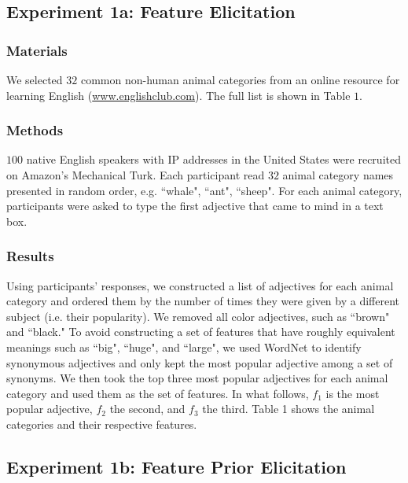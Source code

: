 \documentclass[10pt,letterpaper]{article}
\begin{document}
\subsection{Experiment 1a: Feature Elicitation}
\subsubsection{Materials}
We selected $32$ common non-human animal categories from an online resource for learning English (\url{www.englishclub.com}). The full list is shown in Table $1$.
\subsubsection{Methods}
$100$ native English speakers with IP addresses in the United States were recruited on Amazon's Mechanical Turk. Each participant read $32$ animal category names presented in random order, e.g. ``whale", ``ant", ``sheep". For each animal category, participants were asked to type the first adjective that came to mind in a text box. 
\subsubsection{Results}
Using participants' responses, we constructed a list of adjectives for each animal category and ordered them by the number of times they were given by a different subject (i.e. their popularity). We removed all color adjectives, such as ``brown" and ``black." To avoid constructing a set of features that have roughly equivalent meanings such as ``big", ``huge", and ``large", we used WordNet \cite{Miller95wordnet:a} to identify synonymous adjectives and only kept the most popular adjective among a set of synonyms. We then took the top three most popular adjectives for each animal category and used them as the set of features. In what follows, $f_1$ is the most popular adjective, $f_2$ the second, and $f_3$ the third. Table 1 shows the animal categories and their respective features.

\subsection{Experiment 1b: Feature Prior Elicitation}
\end{document}
